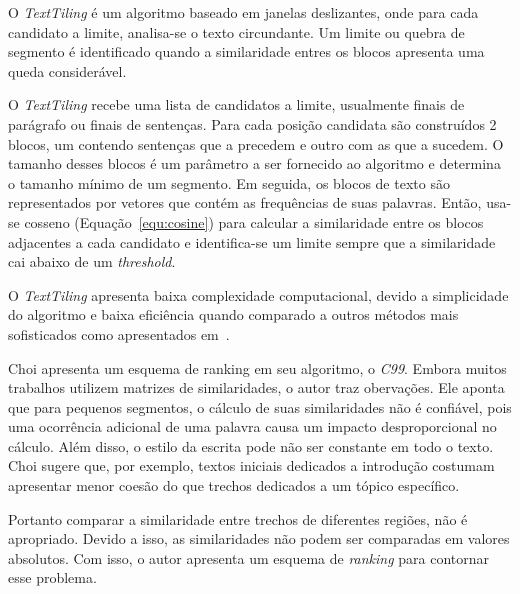 O \textit{TextTiling} é um algoritmo baseado em janelas deslizantes, onde para cada candidato a limite, analisa-se o texto circundante. Um limite ou quebra de segmento é identificado quando a similaridade entres os blocos apresenta uma queda considerável.


O \textit{TextTiling} recebe uma lista de candidatos a limite, usualmente finais de parágrafo ou finais de sentenças. Para cada posição candidata são construídos 2 blocos, um contendo sentenças que a precedem e outro com as que a sucedem. O tamanho desses blocos é um parâmetro a ser fornecido ao algoritmo e determina o tamanho mínimo de um segmento.
%
Em seguida, os blocos de texto são representados por vetores que contém as frequências de suas palavras. Então, usa-se cosseno (Equação~\ref{equ:cosine}) para calcular a similaridade entre os blocos adjacentes a cada candidato e identifica-se um limite sempre que a similaridade cai abaixo de um \textit{threshold}.

O \textit{TextTiling} apresenta baixa complexidade computacional, devido a simplicidade do algoritmo e baixa eficiência quando comparado a outros métodos mais sofisticados como apresentados em~\cite{Choi2000, Kern2009}.




Choi \cite{Choi2000} apresenta um esquema de ranking em seu algoritmo, o \textit{C99}. 
%
Embora muitos trabalhos utilizem matrizes de similaridades, o autor traz obervações.
%
Ele aponta que para pequenos segmentos, o cálculo de suas similaridades não é confiável, pois uma ocorrência adicional de uma palavra causa um impacto desproporcional no cálculo.
%
Além disso, o estilo da escrita pode não ser constante em todo o texto. Choi sugere que, por exemplo, textos iniciais dedicados a introdução costumam apresentar menor coesão do que trechos dedicados a um tópico específico. 
%

Portanto comparar a similaridade entre trechos de diferentes regiões, não é apropriado.
Devido a isso, as similaridades não podem ser comparadas em valores absolutos. Com isso, o autor apresenta um esquema de \textit{ranking} para contornar esse problema.
%



